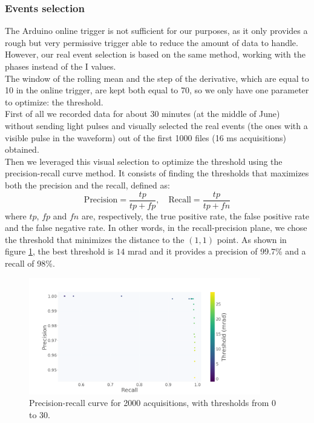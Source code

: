 \documentclass[12pt]{article}
\begin{document}
\subsubsection{Events selection}
The Arduino online trigger is not sufficient for our purposes, as it only provides a rough but very permissive trigger able to reduce the amount of data to handle.\\
However, our real event selection is based on the same method, working with the phases instead of the I values.\\The window of the rolling mean and the step of the derivative, which are equal to 10 in the online trigger, are kept both equal to 70, so we only have one parameter to optimize: the threshold.\\
First of all we recorded data for about 30 minutes (at the middle of June) without sending light pulses and visually selected the real events (the ones with a visible pulse in the waveform) out of the first 1000 files (16 ms acquisitions) obtained.\\
Then we leveraged this visual selection to optimize the threshold using the precision-recall curve method. It consists of finding the thresholds that maximizes both the precision and the recall, defined as:
\begin{equation}
\text{Precision}={\frac {tp}{tp+fp}},\quad \text{Recall}={\frac {tp}{tp+fn}}
\end{equation}
where $tp$, $fp$ and $fn$ are, respectively, the true positive rate, the false positive rate and the false negative rate. In other words, in the recall-precision plane, we chose the threshold that minimizes the distance to the $(1, 1)$ point. As shown in figure \ref{fig: Prec}, the best threshold is $14$ mrad and it provides a precision of 99.7\% and a recall of 98\%.
\begin{figure}[H]
\centering
\includegraphics[width=0.9\textwidth]{prec-rec.png}
\caption{\label{fig: Prec}Precision-recall curve for 2000 acquisitions, with thresholds from 0 to 30.}
\end{figure}
\end{document}
